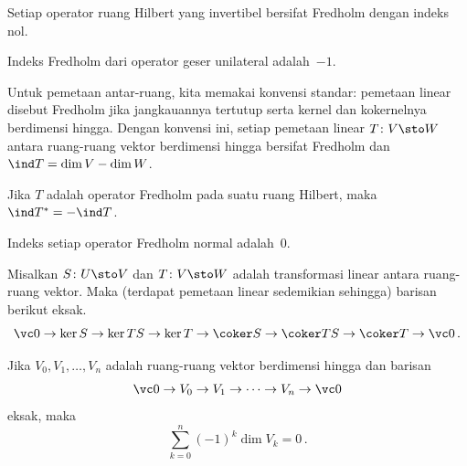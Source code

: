 \begin{exam}\label{0044125} Setiap operator ruang Hilbert yang invertibel bersifat Fredholm
dengan indeks nol.
\end{exam}

\begin{exam}\label{0044128} Indeks Fredholm dari
operator geser unilateral adalah~$-1$.
\end{exam}

\begin{exam} Untuk pemetaan antar-ruang, kita memakai konvensi standar: pemetaan linear disebut Fredholm jika
jangkauannya tertutup serta kernel dan kokernelnya berdimensi hingga. Dengan konvensi ini, setiap pemetaan linear $T\colon V \sto W$ antara ruang-ruang vektor berdimensi hingga bersifat Fredholm dan
$\ind T = \dim V - \dim W$. \end{exam}

\begin{exam}\label{004413} Jika $T$ adalah operator Fredholm pada suatu ruang Hilbert,
maka $\ind T^* = -\ind T$.
\end{exam}

\begin{exam} Indeks setiap operator Fredholm
normal adalah~$0$.
\end{exam}

\begin{lem}\label{004432} Misalkan $S\colon U \sto V$ dan $T\colon V \sto W$ adalah transformasi linear
antara ruang-ruang vektor. Maka (terdapat pemetaan linear sedemikian sehingga) barisan
berikut eksak.
 \[ \vc 0 \to \ker S \to \ker TS \to \ker T \to \coker S
                            \to \coker TS \to \coker T \to \vc 0\,. \]
\end{lem}

\begin{lem}\label{004433} Jika $V_0, V_1, \dots, V_n$ adalah ruang-ruang vektor berdimensi hingga
dan barisan
  \[ \vc 0 \to V_0 \to V_1 \to \dots \to V_n \to \vc 0 \]
eksak, maka
  \[ \sum_{k=0}^n (-1)^k \dim V_k = 0\,. \]
\end{lem}

